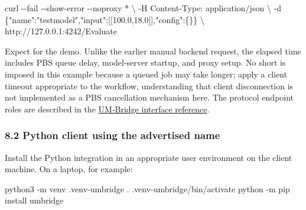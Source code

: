 \documentclass[
  11pt,
  a4paper,
]{article}
\newenvironment{Shaded}{}{}
\newcommand{\AttributeTok}[1]{\textcolor[rgb]{0.49,0.56,0.16}{#1}}
\newcommand{\BuiltInTok}[1]{\textcolor[rgb]{0.00,0.50,0.00}{#1}}
\newcommand{\DataTypeTok}[1]{\textcolor[rgb]{0.56,0.13,0.00}{#1}}
\newcommand{\ExtensionTok}[1]{#1}
\newcommand{\NormalTok}[1]{#1}
\newcommand{\StringTok}[1]{\textcolor[rgb]{0.25,0.44,0.63}{#1}}
\DeclareRobustCommand{\InlineCode}[1]{{\ttfamily\upshape\seqsplit{#1}}}
\renewenvironment{Shaded}{\begin{snugshade}}{\end{snugshade}}
\begin{document}

\begin{Shaded}
\begin{Highlighting}[]
\ExtensionTok{curl} \AttributeTok{{-}{-}fail} \AttributeTok{{-}{-}show{-}error} \AttributeTok{{-}{-}noproxy} \StringTok{\textquotesingle{}*\textquotesingle{}} \DataTypeTok{\textbackslash{}}
    \AttributeTok{{-}H} \StringTok{\textquotesingle{}Content{-}Type: application/json\textquotesingle{}} \DataTypeTok{\textbackslash{}}
    \AttributeTok{{-}d} \StringTok{\textquotesingle{}\{"name":"testmodel","input":[[100.0,18.0]],"config":\{\}\}\textquotesingle{}} \DataTypeTok{\textbackslash{}}
\NormalTok{    http://127.0.0.1:4242/Evaluate}
\end{Highlighting}
\end{Shaded}

Expect \InlineCode{[[254.0]]} for the demo. Unlike the earlier manual
backend request, the elapsed time includes PBS queue delay, model-server
startup, and proxy setup. No short \InlineCode{--max-time} is imposed in
this example because a queued job may take longer; apply a client
timeout appropriate to the workflow, understanding that client
disconnection is not implemented as a PBS cancellation mechanism here.
The protocol endpoint roles are described in the
\href{https://um-bridge-benchmarks.readthedocs.io/en/docs/umbridge/lib.html}{UM-Bridge
interface reference}.

\hypertarget{python-client-using-the-advertised-testmodel-name}{%
\subsubsection{\texorpdfstring{8.2 Python client using the advertised
\InlineCode{testmodel}
name}{8.2 Python client using the advertised
testmodel
name}}\label{python-client-using-the-advertised-testmodel-name}}

Install the Python integration in an appropriate user environment on the
client machine. On a laptop, for example:


\begin{Shaded}
\begin{Highlighting}[]
\ExtensionTok{python3} \AttributeTok{{-}m}\NormalTok{ venv .venv{-}umbridge}
\BuiltInTok{.}\NormalTok{ .venv{-}umbridge/bin/activate}
\ExtensionTok{python} \AttributeTok{{-}m}\NormalTok{ pip install umbridge}
\end{Highlighting}
\end{Shaded}
\end{document}
